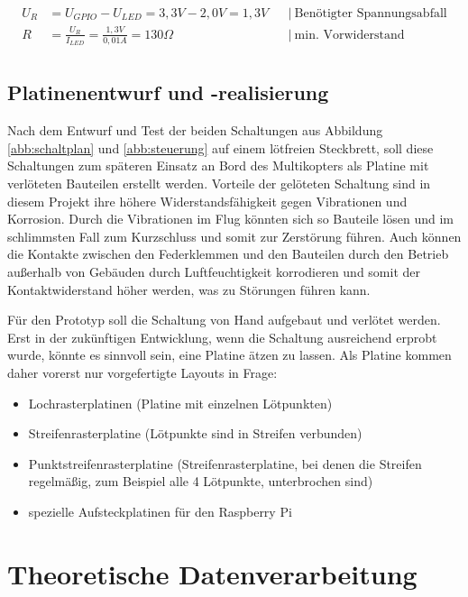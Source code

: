 \documentclass[a4paper,12pt,bibliography=totoc, listof=totoc,titlepage]{scrreprt}
\begin{document}
\begin{equation}
\begin{align}
U_R &= U_{GPIO} - U_{LED} = 3,3V - 2,0V = 1,3V    && \left|\  \text{Benötigter Spannungsabfall} \right. \\
R &= \frac{U_R}{I_{LED}} = \frac{1,3V}{0,01A} = 130\Omega   && \left|\  \text{min. Vorwiderstand} \right. \\
\end{align}
\label{eq:vorwiderstand}
\end{equation}

\section{Platinenentwurf und -realisierung}
Nach dem Entwurf und Test der beiden Schaltungen aus Abbildung \ref{abb:schaltplan} und \ref{abb:steuerung} auf einem lötfreien Steckbrett, soll diese Schaltungen zum späteren Einsatz an Bord des Multikopters als Platine mit verlöteten Bauteilen erstellt werden. Vorteile der gelöteten Schaltung sind in diesem Projekt ihre höhere Widerstandsfähigkeit gegen Vibrationen und Korrosion. Durch die Vibrationen im Flug könnten sich so Bauteile lösen und im schlimmsten Fall zum Kurzschluss und somit zur Zerstörung führen. Auch können die Kontakte zwischen den Federklemmen und den Bauteilen durch den Betrieb außerhalb von Gebäuden durch Luftfeuchtigkeit korrodieren und somit der Kontaktwiderstand höher werden, was zu Störungen führen kann.

Für den Prototyp soll die Schaltung von Hand aufgebaut und verlötet werden. Erst in der zukünftigen Entwicklung, wenn die Schaltung ausreichend erprobt wurde, könnte es sinnvoll sein, eine Platine ätzen zu lassen. Als Platine kommen daher vorerst nur vorgefertigte Layouts in Frage:

\begin{itemize}
 \item Lochrasterplatinen (Platine mit einzelnen Lötpunkten)
 \item Streifenrasterplatine (Lötpunkte sind in Streifen verbunden)
 \item Punktstreifenrasterplatine (Streifenrasterplatine, bei denen die Streifen regelmäßig, zum Beispiel alle 4 Lötpunkte, unterbrochen sind)
 \item spezielle Aufsteckplatinen für den Raspberry Pi
\end{itemize}



\chapter{Theoretische Datenverarbeitung}
\end{document}
